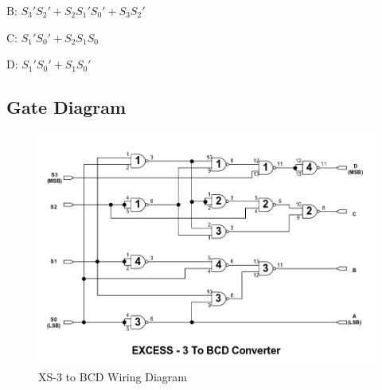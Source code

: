 \documentclass[11pt,a4paper]{article}
\begin{document}
B: $S_3'S_2' + S_2S_1'S_0' + S_3S_2'$

C: $S_1'S_0' + S_2S_1S_0$

D: $S_1'S_0' + S_1S_0'$
\subsection{Gate Diagram}
\begin{figure}[H]
    \centering
    \includegraphics[width=7in]{XS3-BCD.png}
    \caption{XS-3 to BCD Wiring Diagram}
\end{figure}
\end{document}
